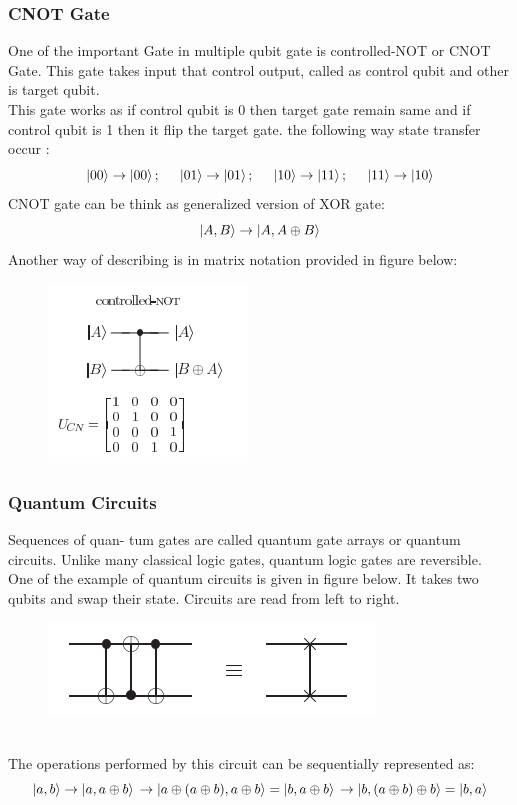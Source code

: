 \documentclass[11 pt]{article}
\theoremstyle{definition}
\theoremstyle{remark}
\newcommand*\xor{\mathbin{\oplus}}
\begin{document}
\subsubsection{CNOT Gate}
One of the important Gate in multiple qubit gate is controlled-NOT or CNOT Gate. This gate takes input that control output, called as control qubit and other is target qubit. \\
This gate works as if control qubit is 0 then target gate remain same and if control qubit is 1 then it flip the target gate. the following way state transfer occur :
$$\ket{00} \rightarrow \ket{00}; \hspace{0.5cm}
\ket{01} \rightarrow \ket{01}; \hspace{0.5cm}
\ket{10} \rightarrow \ket{11}; \hspace{0.5cm}
\ket{11} \rightarrow \ket{10}$$
CNOT gate can be think as generalized version of XOR gate:
$$\ket{A,B} \rightarrow \ket{A, A\xor{B}}$$
Another way of describing is in matrix notation provided in figure below:
\begin{figure}[htp]
    \centering
    \includegraphics{CNOT.png}
\end{figure}

\subsubsection{Quantum Circuits}
Sequences of quan- tum gates are called quantum gate arrays or quantum circuits. Unlike many classical logic gates, quantum logic gates are reversible.\\
One of the example of quantum circuits is given in figure below. It takes two qubits and swap their state. Circuits are read from left to right.
\begin{figure}[htp]
    \centering
    \includegraphics{Circuit.png}
\end{figure}\\
The operations performed by this circuit can be sequentially represented as:
$$\ket{a,b} \rightarrow \ket{a,a\xor{b}} \\
    \rightarrow \ket{a\xor{(a\xor{b})},a\xor{b}} = \ket{b,a\xor{b}}\\
    \rightarrow \ket{b,(a\xor{b})\xor{b}} = \ket{b,a}$$
\\
\end{document}
